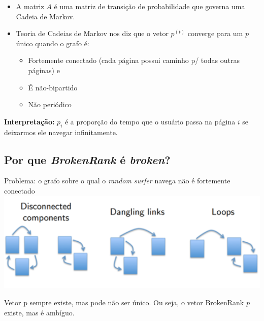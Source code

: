 \documentclass[
  letterpaper,
  DIV=11,
  numbers=noendperiod]{scrartcl}
\providecommand{\tightlist}{%
  \setlength{\itemsep}{0pt}\setlength{\parskip}{0pt}}\usepackage{longtable,booktabs,array}
\begin{document}
\begin{itemize}
\item
  A matriz \(A\) é uma matriz de transição de probabilidade que governa
  uma Cadeia de Markov.
\item
  Teoria de Cadeias de Markov nos diz que o vetor \(p^{(t)}\) converge
  para um \(p\) único quando o grafo é:

  \begin{itemize}
  \tightlist
  \item
    Fortemente conectado (cada página possui caminho p/ todas outras
    páginas) e
  \item
    É não-bipartido
  \item
    Não periódico
  \end{itemize}
\end{itemize}

\textbf{Interpretação:} \(p_i\) é a proporção do tempo que o usuário
passa na página \(i\) se deixarmos ele navegar infinitamente.

\hypertarget{por-que-brokenrank-uxe9-broken}{%
\subsection{\texorpdfstring{Por que \emph{BrokenRank} é
\emph{broken}?}{Por que BrokenRank é broken?}}\label{por-que-brokenrank-uxe9-broken}}

Problema: o grafo sobre o qual o \emph{random surfer} navega não é
fortemente conectado \includegraphics{figs/Aula09/PR_componentes.png}

\begin{tcolorbox}[enhanced jigsaw, colbacktitle=quarto-callout-note-color!10!white, colframe=quarto-callout-note-color-frame, opacityback=0, breakable, toprule=.15mm, leftrule=.75mm, titlerule=0mm, coltitle=black, bottomtitle=1mm, colback=white, toptitle=1mm, title=\textcolor{quarto-callout-note-color}{\faInfo}\hspace{0.5em}{Note}, arc=.35mm, rightrule=.15mm, bottomrule=.15mm, left=2mm, opacitybacktitle=0.6]
Vetor p sempre existe, mas pode não ser único. Ou seja, o vetor
BrokenRank \(p\) existe, mas é ambíguo.
\end{tcolorbox}
\end{document}
